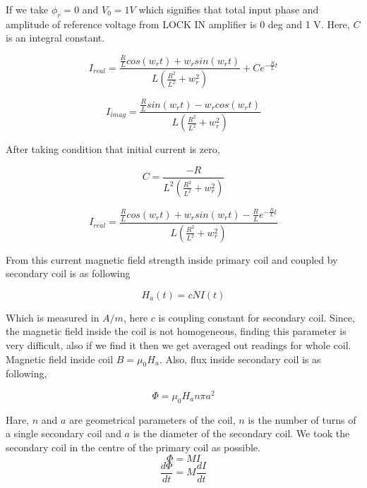 If we take $\phi_r = 0$ and $V_0 = 1 V$ which signifies that total input phase and amplitude of reference voltage from LOCK IN amplifier is 0 deg and 1 V. Here, $C$ is an integral constant.
 

\begin{equation}
I_{real} = \frac{\frac{R}{L} cos(w_rt)+w_r sin(w_rt)}{L(\frac{R^2}{L^2}+w_r^2)}+Ce^{-\frac{R}{L}t}
\end{equation}

\begin{equation}
I_{imag}=\frac{\frac{R}{L} sin(w_rt)-w_r cos(w_rt)}{L(\frac{R^2}{L^2}+w_r^2)}
\end{equation}

 After taking condition that initial current is zero, 

\begin{equation}
C = \frac{-R}{L^2(\frac{R^2}{L^2}+w_r^2)}
\end{equation}

\begin{equation}
I_{real} = \frac{\frac{R}{L} cos(w_rt)+w_r sin(w_rt) -\frac{R}{L}e^{-\frac{R}{L}t}}{L(\frac{R^2}{L^2}+w_r^2)}
\end{equation}

From this current magnetic field strength inside primary coil and coupled by secondary coil is as following

\begin{equation*}
H_a(t) = c N I(t)
\end{equation*}

Which is measured in $A/m$, here $c$ is coupling constant for secondary coil. Since, the magnetic field inside the coil is not homogeneous, finding this parameter is very difficult, also if we find it then we get averaged out readings for whole coil. Magnetic field inside coil $B=\mu_0 H_a$. Also, flux inside secondary coil is as following, 

\begin{equation*}
\Phi = \mu_0 H_a n \pi a^2
\end{equation*}

Hare, $n$ and $a$ are geometrical parameters of the coil, $n$ is the number of turns of a single secondary coil and $a$ is the diameter of the secondary coil. We took the secondary coil in the centre of the primary coil as possible.
\begin{equation*}
\Phi = M I
\end{equation*}
\begin{equation*}
\frac{d\Phi}{dt} = M \frac{dI}{dt}
\end{equation*}

